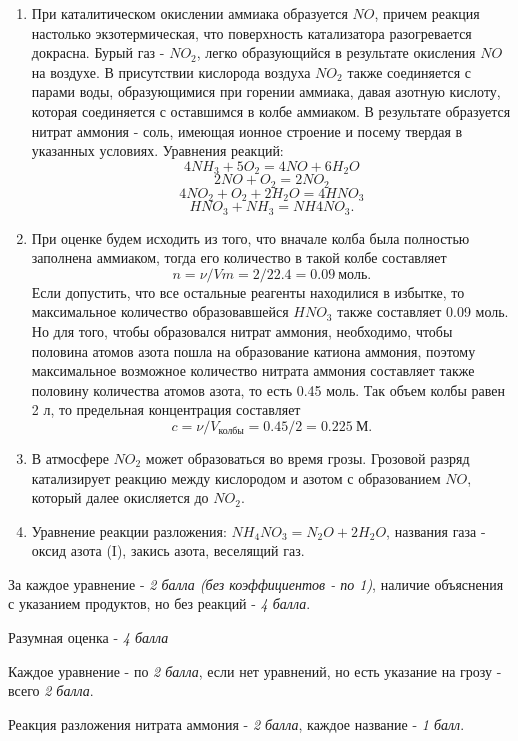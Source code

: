 \solutionSection

\begin{enumerate}
    \item При каталитическом окислении аммиака образуется $NO$, причем реакция настолько экзотермическая, 
    что поверхность катализатора разогревается докрасна. Бурый газ - $NO_2$, легко образующийся в 
    результате окисления $NO$ на воздухе. В присутствии кислорода воздуха $NO_2$ также соединяется с парами воды, 
    образующимися при горении аммиака, давая азотную кислоту, которая соединяется с оставшимся в колбе аммиаком. 
    В результате образуется нитрат аммония - соль, имеющая ионное строение и посему твердая в указанных условиях.
    Уравнения реакций:
    $$4NH_3 + 5O_2 = 4NO + 6H_2O$$
    $$2NO + O_2 = 2NO_2$$
    $$4NO_2 + O_2 + 2H_2O = 4HNO_3$$
    $$HNO_3 + NH_3 = NH4NO_3.$$
    \item При оценке будем исходить из того, что вначале колба была полностью заполнена аммиаком, тогда его количество в такой 
    колбе составляет $$n = \nu/Vm = 2/22.4 = 0.09 \: \text{моль}.$$ Если допустить, что все остальные реагенты находилися в 
    избытке, то максимальное количество образовавшейся $HNO_3$ также составляет 0.09 моль. Но для того, чтобы 
    образовался нитрат аммония, необходимо, чтобы половина атомов азота пошла на образование катиона аммония, 
    поэтому максимальное возможное количество нитрата аммония составляет также половину количества атомов азота, 
    то есть 0.45 моль. Так объем колбы равен 2 л, то предельная концентрация составляет $$c = \nu/V_{\text{колбы}}=0.45/2 = 0.225 \: \text{М}.$$
    \item В атмосфере $NO_2$ может образоваться во время грозы. Грозовой разряд катализирует реакцию между кислородом и азотом с образованием $NO$, 
    который далее окисляется до $NO_2$.
    \item Уравнение реакции разложения:  $NH_4NO_3 = N_2O + 2H_2O$, названия газа - оксид азота (I), закись азота, 
    веселящий газ.
\end{enumerate}

За каждое уравнение - \textit{2 балла (без коэффициентов - по 1)}, наличие объяснения с указанием продуктов, но без реакций - \textit{4 балла}.

Разумная оценка - \textit{4 балла}

Каждое уравнение - по \textit{2 балла}, если нет уравнений, но есть указание на грозу - всего \textit{2 балла}.

Реакция разложения нитрата аммония - \textit{2 балла}, каждое название - \textit{1 балл}.
